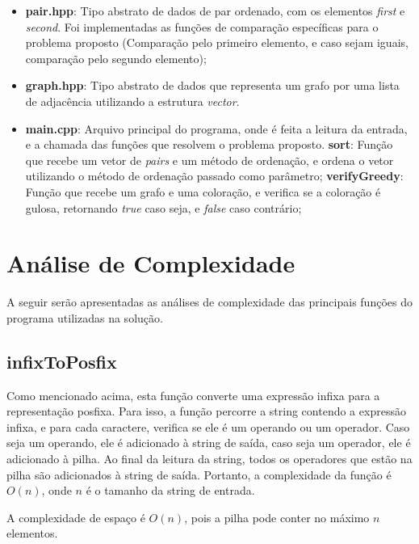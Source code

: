 \documentclass{article}
\begin{document}
\begin{itemize}
    \item \textbf{pair.hpp}: Tipo abstrato de dados de par ordenado, com os elementos \emph{first} e \emph{second}. Foi implementadas as funções de comparação específicas para o problema proposto (Comparação pelo primeiro elemento, e caso sejam iguais, comparação pelo segundo elemento);
    \item \textbf{graph.hpp}: Tipo abstrato de dados que representa um grafo por uma lista de adjacência utilizando a estrutura \emph{vector}. 
    \item \textbf{main.cpp}: Arquivo principal do programa, onde é feita a leitura da entrada, e a chamada das funções que resolvem o problema proposto.
        \subitem \textbf{sort}: Função que recebe um vetor de \emph{pairs} e um método de ordenação, e ordena o vetor utilizando o método de ordenação passado como parâmetro;
        \subitem \textbf{verifyGreedy}: Função que recebe um grafo e uma coloração, e verifica se a coloração é gulosa, retornando \emph{true} caso seja, e \emph{false} caso contrário;
    
\end{itemize}

\section{Análise de Complexidade}

A seguir serão apresentadas as análises de complexidade das principais funções do programa utilizadas na solução.

\subsection{infixToPosfix}
Como mencionado acima, esta função converte uma expressão infixa para a representação posfixa. Para isso, a função percorre a string contendo a expressão infixa, e para cada caractere, verifica se ele é um operando ou um operador. Caso seja um operando, ele é adicionado à string de saída, caso seja um operador, ele é adicionado à pilha. Ao final da leitura da string, todos os operadores que estão na pilha são adicionados à string de saída. Portanto, a complexidade da função é $O(n)$, onde $n$ é o tamanho da string de entrada.

A complexidade de espaço é $O(n)$, pois a pilha pode conter no máximo $n$ elementos.
\end{document}

